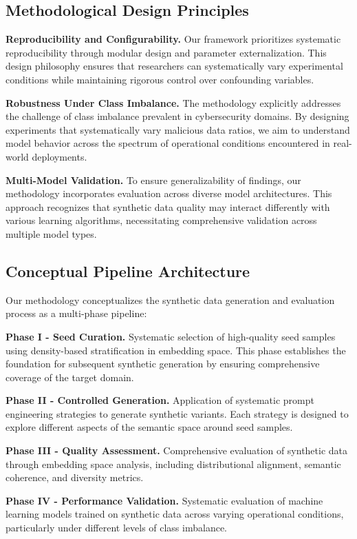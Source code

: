 \subsection{Methodological Design Principles}

\textbf{Reproducibility and Configurability.} Our framework prioritizes systematic reproducibility through modular design and parameter externalization. This design philosophy ensures that researchers can systematically vary experimental conditions while maintaining rigorous control over confounding variables.

\textbf{Robustness Under Class Imbalance.} The methodology explicitly addresses the challenge of class imbalance prevalent in cybersecurity domains. By designing experiments that systematically vary malicious data ratios, we aim to understand model behavior across the spectrum of operational conditions encountered in real-world deployments.

\textbf{Multi-Model Validation.} To ensure generalizability of findings, our methodology incorporates evaluation across diverse model architectures. This approach recognizes that synthetic data quality may interact differently with various learning algorithms, necessitating comprehensive validation across multiple model types.

\subsection{Conceptual Pipeline Architecture}

Our methodology conceptualizes the synthetic data generation and evaluation process as a multi-phase pipeline:

\textbf{Phase I - Seed Curation.} Systematic selection of high-quality seed samples using density-based stratification in embedding space. This phase establishes the foundation for subsequent synthetic generation by ensuring comprehensive coverage of the target domain.

\textbf{Phase II - Controlled Generation.} Application of systematic prompt engineering strategies to generate synthetic variants. Each strategy is designed to explore different aspects of the semantic space around seed samples.

\textbf{Phase III - Quality Assessment.} Comprehensive evaluation of synthetic data through embedding space analysis, including distributional alignment, semantic coherence, and diversity metrics.

\textbf{Phase IV - Performance Validation.} Systematic evaluation of machine learning models trained on synthetic data across varying operational conditions, particularly under different levels of class imbalance.

